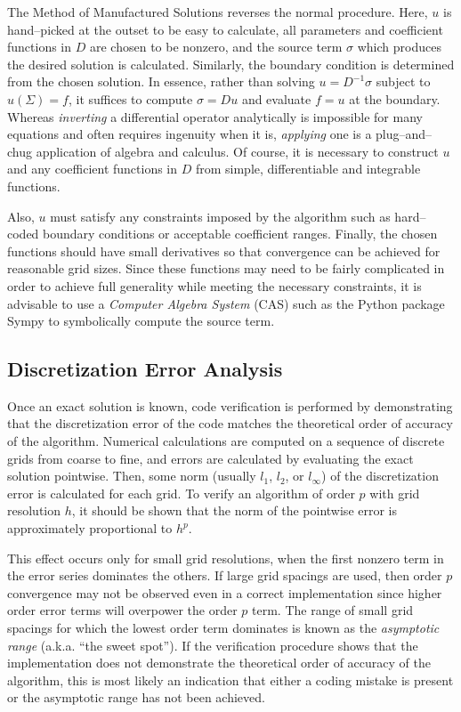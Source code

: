 The Method of Manufactured Solutions reverses the normal procedure.
Here, $u$ is hand--picked at the outset to be easy to calculate, all parameters and coefficient functions in $D$ are chosen to be nonzero, and the source term $\sigma$ which produces the desired solution is calculated.
Similarly, the boundary condition is determined from the chosen solution.
In essence, rather than solving $u = D^{-1}\sigma$ subject to $u(\Sigma)=f$, it suffices to compute $\sigma = Du$ and evaluate $f=u$ at the boundary.
Whereas \textit{inverting} a differential operator analytically is impossible for many equations and often requires ingenuity when it is, \textit{applying} one is a plug--and--chug application of algebra and calculus.
Of course, it is necessary to construct $u$ and any coefficient functions in $D$ from simple, differentiable and integrable functions.

Also, $u$ must satisfy any constraints imposed by the algorithm such as hard--coded boundary conditions or acceptable coefficient ranges.
Finally, the chosen functions should have small derivatives so that convergence can be achieved for reasonable grid sizes.
Since these functions may need to be fairly complicated in order to achieve full generality while meeting the necessary constraints, it is advisable to use a \textit{Computer Algebra System} (CAS) such as the Python package Sympy \cite{meurer_sympy:_2017} to symbolically compute the source term.


\subsection{Discretization Error Analysis}
Once an exact solution is known, code verification is performed by demonstrating that the discretization error of the code matches the theoretical order of accuracy of the algorithm.
Numerical calculations are computed on a sequence of discrete grids from coarse to fine, and errors are calculated by evaluating the exact solution pointwise.
Then, some norm (usually $l_1$, $l_2$, or $l_\infty$) of the discretization error is calculated for each grid.
To verify an algorithm of order $p$ with grid resolution $h$, it should be shown that the norm of the pointwise error is approximately proportional to $h^p$.

This effect occurs only for small grid resolutions, when the first nonzero term in the error series dominates the others.
If large grid spacings are used, then order $p$ convergence may not be observed even in a correct implementation since higher order error terms will overpower the order $p$ term.
The range of small grid spacings for which the lowest order term dominates is known as the \textit{asymptotic range} (a.k.a. ``the sweet spot'').
If the verification procedure shows that the implementation does not demonstrate the theoretical order of accuracy of the algorithm, this is most likely \cite{roache_verification_1998-1} an indication that either a coding mistake is present or the asymptotic range has not been achieved.

